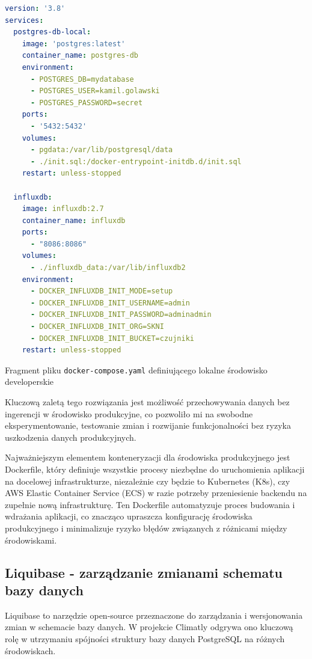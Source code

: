 \documentclass[a4paper,12pt,openany]{book}
\begin{document}
\begin{lstfloat}[htbp]
\begin{lstlisting}[language=yaml]
version: '3.8'
services:
  postgres-db-local:
    image: 'postgres:latest'
    container_name: postgres-db
    environment:
      - POSTGRES_DB=mydatabase
      - POSTGRES_USER=kamil.golawski
      - POSTGRES_PASSWORD=secret
    ports:
      - '5432:5432'
    volumes:
      - pgdata:/var/lib/postgresql/data
      - ./init.sql:/docker-entrypoint-initdb.d/init.sql
    restart: unless-stopped

  influxdb:
    image: influxdb:2.7
    container_name: influxdb
    ports:
      - "8086:8086"
    volumes:
      - ./influxdb_data:/var/lib/influxdb2
    environment:
      - DOCKER_INFLUXDB_INIT_MODE=setup
      - DOCKER_INFLUXDB_INIT_USERNAME=admin
      - DOCKER_INFLUXDB_INIT_PASSWORD=adminadmin
      - DOCKER_INFLUXDB_INIT_ORG=SKNI
      - DOCKER_INFLUXDB_INIT_BUCKET=czujniki
    restart: unless-stopped
\end{lstlisting}
\caption{Fragment pliku \texttt{docker-compose.yaml} definiującego lokalne środowisko developerskie}
\label{lst:docker-compose}
\end{lstfloat}

Kluczową zaletą tego rozwiązania jest możliwość przechowywania danych bez ingerencji w środowisko produkcyjne, co pozwoliło mi na swobodne eksperymentowanie, testowanie zmian i rozwijanie funkcjonalności bez ryzyka uszkodzenia danych produkcyjnych.

Najważniejszym elementem konteneryzacji dla środowiska produkcyjnego jest Dockerfile, który definiuje wszystkie procesy niezbędne do uruchomienia aplikacji na docelowej infrastrukturze, niezależnie czy będzie to Kubernetes (K8s), czy AWS Elastic Container Service (ECS) w razie potrzeby przeniesienie backendu na zupełnie nową infrastrukturę. Ten Dockerfile automatyzuje proces budowania i wdrażania aplikacji, co znacząco upraszcza konfigurację środowiska produkcyjnego i minimalizuje ryzyko błędów związanych z różnicami między środowiskami.


\clearpage

\subsection*{Liquibase - zarządzanie zmianami schematu bazy danych}

Liquibase to narzędzie open-source przeznaczone do zarządzania i wersjonowania zmian w schemacie bazy danych. W projekcie Climatly odgrywa ono kluczową rolę w utrzymaniu spójności struktury bazy danych PostgreSQL na różnych środowiskach.
\end{document}
